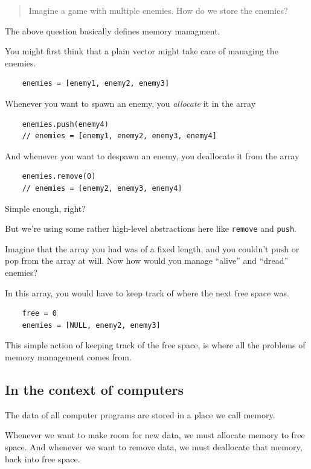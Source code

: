 \documentclass[index]{subfiles}
\begin{document}
\begin{quote}
    Imagine a game with multiple enemies. How do we store the enemies?
\end{quote}

The above question basically defines memory managment.

You might first think that a plain vector might take care of managing the enemies.

\begin{verbatim}
    enemies = [enemy1, enemy2, enemy3]
\end{verbatim}

Whenever you want to spawn an enemy, you \textit{allocate} it in the array

\begin{verbatim}
    enemies.push(enemy4)
    // enemies = [enemy1, enemy2, enemy3, enemy4]
\end{verbatim}

And whenever you want to despawn an enemy, you deallocate it from the array

\begin{verbatim}
    enemies.remove(0)
    // enemies = [enemy2, enemy3, enemy4]
\end{verbatim}

Simple enough, right?

But we're using some rather high-level abstractions here like \verb+remove+ and \verb+push+.

Imagine that the array you had was of a fixed length, and you couldn't push or pop from the array at will. Now how would you manage ``alive'' and ``dread'' enemies?

In this array, you would have to keep track of where the next free space was.

\begin{verbatim}
    free = 0
    enemies = [NULL, enemy2, enemy3]
\end{verbatim}

This simple action of keeping track of the free space, is where all the problems of memory management comes from.

\subsection{In the context of computers}

The data of all computer programs are stored in a place we call memory.

Whenever we want to make room for new data, we must allocate memory to free space. And whenever we want to remove data, we must deallocate that memory, back into free space.
\end{document}
